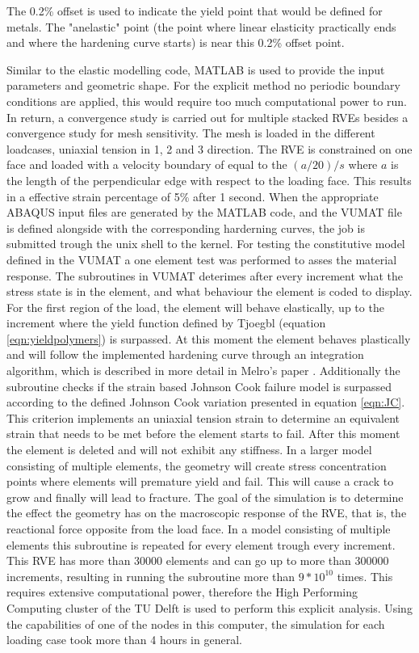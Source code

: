 The 0.2\% offset is used to indicate the yield point that would be defined for metals. The "anelastic" point (the point where linear elasticity practically ends and  where the hardening curve starts) is near this 0.2\% offset point. 


Similar to the elastic modelling code, MATLAB is used to provide the input parameters and geometric shape. For the explicit method no periodic boundary conditions are applied, this would require too much computational power to run. In return, a convergence study is carried out for multiple stacked RVEs besides a convergence study for mesh sensitivity. 
The mesh is loaded in the different loadcases, uniaxial tension in 1, 2 and 3 direction. The RVE is constrained on one face and loaded with a velocity boundary of equal to the $(a/20)/s$ where $a$ is the length of the perpendicular edge with respect to the loading face. This results in a effective strain percentage of 5\% after 1 second. 
When the appropriate ABAQUS input files are generated by the MATLAB code, and the VUMAT file is defined alongside with the corresponding harderning curves, the job is submitted trough the unix shell to the kernel.
For testing the constitutive model defined in the VUMAT a one element test was performed to asses the material response. The subroutines in VUMAT deterimes after every increment what the stress state is in the element, and what behaviour the element is coded to display. For the first region of the load, the element will behave elastically, up to the increment where the yield function defined by Tjoegbl (equation \ref{eqn:yieldpolymers}) is surpassed. At this moment the element behaves plastically and will follow the implemented hardening curve through an integration algorithm, which is described in more detail in Melro's paper \cite{Melro2013MicromechanicalModelling}.  Additionally the subroutine checks if the strain based Johnson Cook failure model is surpassed according to the defined Johnson Cook variation presented in equation \ref{eqn:JC}. This criterion implements an uniaxial tension strain to determine an equivalent strain that needs to be met before the element starts to fail. After this moment the element is deleted and will not exhibit any stiffness. 
In a larger model consisting of multiple elements, the geometry will create stress concentration points where elements will premature yield and fail. This will cause a crack to grow and finally will lead to fracture. The goal of the simulation is to determine the effect the geometry has on the macroscopic response of the RVE, that is, the reactional force opposite from the load face.
In a model consisting of multiple elements this subroutine is repeated for every element trough every increment. This RVE has more than 30000 elements and can go up to more than 300000 increments, resulting in running the subroutine more than $9*10^{10}$ times. This requires extensive computational power, therefore the High Performing Computing cluster of the TU Delft is used to perform this explicit analysis. Using the capabilities of one of the nodes in this computer, the simulation for each loading case took more than 4 hours in general.


